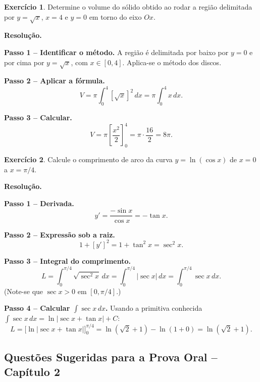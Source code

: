 \documentclass[12pt,a4paper]{article}
\theoremstyle{definition}
\newtheorem{exercise}{Exercício}[section]
\theoremstyle{remark}
\begin{document}
\begin{exercise}
  Determine o volume do sólido obtido ao rodar a região delimitada por
  $y=\sqrt{x}$, $x=4$ e $y=0$ em torno do eixo $Ox$.

  \medskip\textbf{Resolução.}

  \textbf{Passo 1 -- Identificar o método.} A região é delimitada por baixo por
  $y=0$ e por cima por $y=\sqrt{x}$, com $x\in[0,4]$. Aplica-se o método dos
  discos.

  \textbf{Passo 2 -- Aplicar a fórmula.}
  \[
    V = \pi\int_0^4 [\sqrt{x}]^2\,dx = \pi\int_0^4 x\,dx.
  \]

  \textbf{Passo 3 -- Calcular.}
  \[
    V = \pi\left[\frac{x^2}{2}\right]_0^4 = \pi\cdot\frac{16}{2} = 8\pi.
  \]
\end{exercise}

\begin{exercise}
  Calcule o comprimento de arco da curva $y = \ln(\cos x)$ de $x=0$ a
  $x=\pi/4$.

  \medskip\textbf{Resolução.}

  \textbf{Passo 1 -- Derivada.}
  \[
    y' = \frac{-\sin x}{\cos x} = -\tan x.
  \]

  \textbf{Passo 2 -- Expressão sob a raiz.}
  \[
    1+[y']^2 = 1+\tan^2 x = \sec^2 x.
  \]

  \textbf{Passo 3 -- Integral do comprimento.}
  \[
    L = \int_0^{\pi/4}\sqrt{\sec^2 x}\,dx = \int_0^{\pi/4}|\sec x|\,dx
    = \int_0^{\pi/4}\sec x\,dx.
  \]
  (Note-se que $\sec x > 0$ em $[0,\pi/4]$.)

  \textbf{Passo 4 -- Calcular $\int\sec x\,dx$.}
  Usando a primitiva conhecida $\int\sec x\,dx = \ln|\sec x+\tan x|+C$:
  \[
    L = \Big[\ln|\sec x + \tan x|\Big]_0^{\pi/4}
    = \ln\!\left(\sqrt{2}+1\right) - \ln(1+0)
    = \ln(\sqrt{2}+1).
  \]
\end{exercise}

\subsection{Questões Sugeridas para a Prova Oral -- Capítulo 2}
\end{document}
